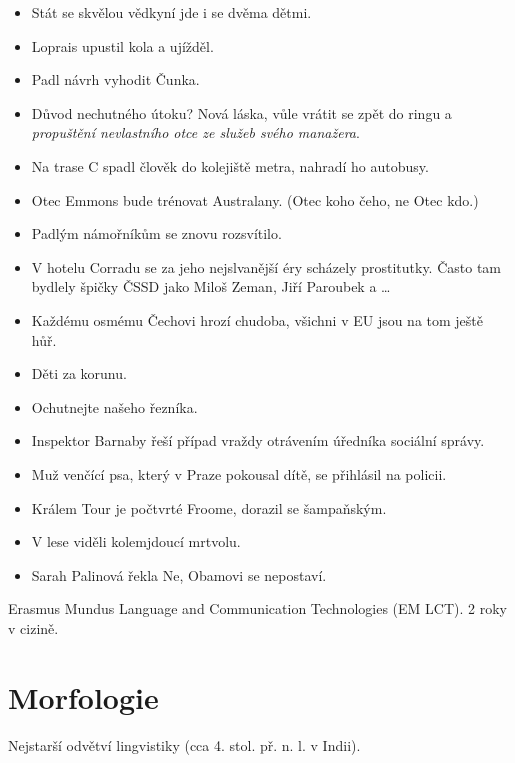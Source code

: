 \documentclass[12pt]{article}					%
\begin{document}
\begin{poznamka}
	\begin{itemize}
		\item Stát se skvělou vědkyní jde i se dvěma dětmi.
		\item Loprais upustil kola a ujížděl.
		\item Padl návrh vyhodit Čunka.
		\item Důvod nechutného útoku? Nová láska, vůle vrátit se zpět do ringu a \emph{propuštění nevlastního otce ze služeb svého manažera}.
		\item Na trase C spadl člověk do kolejiště metra, nahradí ho autobusy.
		\item Otec Emmons bude trénovat Australany. (Otec koho čeho, ne Otec kdo.)
		\item Padlým námořníkům se znovu rozsvítilo.
		\item V hotelu Corradu se za jeho nejslvanější éry scházely prostitutky. Často tam bydlely špičky ČSSD jako Miloš Zeman, Jiří Paroubek a …
		\item Každému osmému Čechovi hrozí chudoba, všichni v EU jsou na tom ještě hůř.
		\item Děti za korunu.
		\item Ochutnejte našeho řezníka.
		\item Inspektor Barnaby řeší případ vraždy otrávením úředníka sociální správy.
		\item Muž venčící psa, který v Praze pokousal dítě, se přihlásil na policii.
		\item Králem Tour je počtvrté Froome, dorazil se šampaňským.
		\item V lese viděli kolemjdoucí mrtvolu.
		\item Sarah Palinová řekla Ne, Obamovi se nepostaví.
	\end{itemize}
\end{poznamka}

\begin{poznamka}
	Erasmus Mundus Language and Communication Technologies (EM LCT). 2 roky v cizině.
\end{poznamka}


\section{Morfologie}
\begin{poznamka}[Historie]
	Nejstarší odvětví lingvistiky (cca 4. stol. př. n. l. v Indii).
\end{poznamka}
\end{document}

